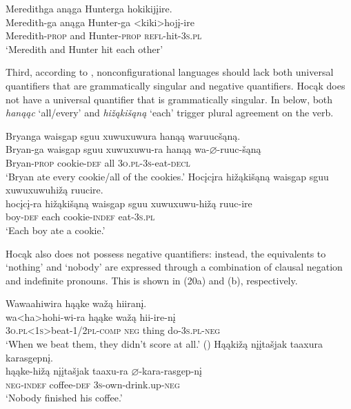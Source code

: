 \documentclass[output=paper]{LSP/langsci}
\begin{document}
\begin{exe}
\ex 
\glll Meredithga		anąga 	Hunterga 			hokikij\k{i}ire.\\
Meredith-ga	 	anąga 	Hunter-ga 			<kiki>hoj\k{i}-ire \\
Meredith-\textsc{prop} and 		Hunter-\textsc{prop} 	\textsc{refl}-hit-\textsc{3s.pl} \\
\trans `Meredith and Hunter hit each other'
\end{exe}
	
Third, according to \citet{Baker1996}, nonconfigurational languages should lack both universal quantifiers that are grammatically singular and negative quantifiers. Hocąk does not have a universal quantifier that is grammatically singular.  In  below, both \textit{hanąąc} `all/every' and \textit{hi\v{z}ąki\v{s}ąną} `each' trigger plural agreement on the verb.

\begin{exe}
\ex	
\begin{xlist}
\ex	
\glll Bryanga {waisgap sguu xuwuxuwura} 	hanąą 	waruuc\v{s}ąną.\\
Bryan-ga 	{waisgap sguu xuwuxuwu-ra} 	hanąą 	wa-$\varnothing$-ruuc-\v{s}ąną \\
	Bryan-\textsc{prop} 	cookie-\textsc{def}	all 		\textsc{3o.pl-3s}-eat-\textsc{decl} \\
\trans `Bryan ate every cookie/all of the cookies.'
\ex 
\glll Hoc\k{i}c\k{i}ra 	hi\v{z}ąki\v{s}ąną 	{waisgap sguu xuwuxuwuhi\v{z}ą }		ruucire.\\
hoc\k{i}c\k{i}-ra 	hi\v{z}ąki\v{s}ąną 	{waisgap sguu xuwuxuwu-hi\v{z}ą }		ruuc-ire \\
	boy-\textsc{def} 		each 					cookie-\textsc{indef}		eat-\textsc{3s.pl}\\
\trans `Each boy ate a cookie.'
\end{xlist}
\end{exe}

Hocąk also does not possess negative quantifiers: instead, the equivalents to `nothing' and `nobody' are expressed through a combination of clausal negation and indefinite pronouns. This is shown in (20a) and (b), respectively.

\begin{exe}
\ex
\begin{xlist}
\ex	
\glll Wawaahiwira 	hąąke 	wa\v{z}ą 	hiiran\k{i}. \\
wa<ha>hohi-wi-ra 						hąąke 	wa\v{z}ą 	hii-ire-n\k{i} \\
	\textsc{3o.pl<1s>}beat-\textsc{1/2pl}-\textsc{comp} \textsc{neg}		thing 	do-\textsc{3s.pl-neg} \\
\trans `When we beat them, they didn't score at all.' (\citealt{Hartmann2012})
\ex	
\glll Hąąki\v{z}ą 	{n\k{i}\k{i}ta\v{s}jak taaxura} 	karasgepn\k{i}. \\
hąąke-hi\v{z}ą  {n\k{i}\k{i}ta\v{s}jak taaxu-ra }	$\varnothing$-kara-rasgep-n\k{i} \\
	\textsc{neg-indef} 	coffee-\textsc{def}	\textsc{3s}-own-drink.up-\textsc{neg} \\
\trans `Nobody finished his coffee.'
\end{xlist}
\end{exe}
	
\end{document}
